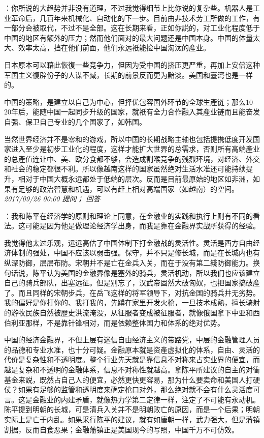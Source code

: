 \documentclass[twocolumn]{ctexart}
\begin{document}
：你所说的大趋势并非没有道理，不过我觉得细节上比你说的复杂些。机器人是工业革命后，几百年来机械化、自动化的下一步。目前由非技术劳工所做的工作，有一部分会被取代，不过不是全部。这在长期来看，正如你説的，对工业化程度低于中国的地区有额外的压力；然而他们面对的最大问题还是中国本身。中国的体量太大、效率太高，挡在他们前面，他们永远衹能捡中国淘汰的產业。

日本原本可以藉此恢復一些竞争力，但因为受中国的挤压更严重，再加上安倍这种军国主义復辟份子的人谋不臧，长期的前景反而更为黯淡。美国和臺湾也是一样的。

中国的策略，是建立以自己为中心，但择优包容国外环节的全球生產链；那么10-20年后，能随中国一起同步升级的国家，就衹有全力合作融入其產业链而且能奋发自强、保卫自己专业的几个国家了，如韩国。

当然世界经济并不是零和的游戏，所以中国的长期战略主轴也包括提携低度开发国家进入至少是初步工业化的程度，这样才能扩大世界的总需求，否则所有高端產业的总產值连让中、美、欧分食都不够，会造成割喉竞争的残烈环境，对经济、外交和社会的稳定都很不利。所以像越南这样的国家虽然绝对生活水准还可能持续提升，相对于中国大概永远都处于低端的层次。反而是目前最原始的地区如非洲，如果有足够的政治智慧和机遇，可以有赶上相对高端国家（如越南）的空间。\\

\textit{\hfill\noindent\small 2017/09/26 00:00 提问； 回答}

：我和陈平在经济学的原则和理论上同意，在金融业的实践和执行上则有不同的看法。这可能是因为他是做理论经济学出身，而我是靠在金融界实战所获得的经验。

我觉得他太过乐观，远远高估了中国体制下打金融战的灵活性。灵活是西方自由经济体制的强处，中国不应该以弱击强。保守，并不只是修长城，而是在长城内也有纵深防御，层层布防。宋朝并不是亡在金兵入关，而在于没有第二綫防御能力。换句话说，陈平认为美国的金融界像是塞外的骑兵，灵活机动，所以我们也应该建立自己的骑兵部队，出塞远征。但是别忘了，汉武帝固然大破匈奴，也把国家搞破產了。而且同样的宋朝步兵，在岳飞这样的将军领导下，对抗金国的骑兵并无劣势。我的偏好是你打你的、我打我的，先蹲在家里开发火枪，一旦技术成熟，擅长骑射的游牧民族自然被歷史洪流淹没，从征服者变成被征服者，就像俄国拿下中亚和西伯利亚那样，不是靠针锋相对，而是依赖整体国力和体系的绝对优势。

中国的经济金融界，不但上层有迷信自由经济主义的带路党，中层的金融管理人员的品德和专业水准，也十分可疑。金融原本就是资產虚拟化的体系，自由、灵活的代价是复杂性和不透明度。整个行业先天就是靠信息不对称来占实业界的便宜，而越是复杂和不透明的金融体系，信息不对称性就越高。拿陈平所建议的自主的对衝基金来説，既然占自己人的便宜，必然更快更容易，那为什么要卖命和美国人打硬仗？如果有足够的监管和透明度来确定枪口对外，那么绝对就不会有什么灵活度可言。这是金融业的内建矛盾，就像热力学第二定律一样，注定了不可能有永动机。陈平提到明朝的长城，可是清兵入关并不是明朝败亡的原因，而是一个后果；明朝实际上是亡于内乱。如果采行陈平的建议，就有如唐朝一样，武力强大，但是藩镇割据，反而自食恶果；金融藩镇正是美国现今的写照，中国千万不可仿效。
\end{document}
